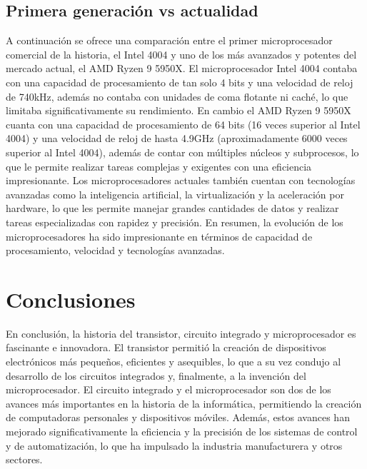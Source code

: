 \documentclass{article}
\begin{document}

\subsection*{Primera generación vs actualidad}
A continuación se ofrece una comparación entre el primer microprocesador comercial de la historia, 
el Intel 4004 y uno de los más avanzados y potentes del mercado actual, el AMD Ryzen 9 5950X. 
El microprocesador Intel 4004 contaba con una capacidad de procesamiento de tan solo 4 bits y una 
velocidad de reloj de 740kHz, además no contaba con unidades de coma flotante ni caché, lo que limitaba 
significativamente su rendimiento. En cambio el AMD Ryzen 9 5950X cuanta con una capacidad de procesamiento
de 64 bits (16 veces superior al Intel 4004) y una velocidad de reloj de hasta 4.9GHz (aproximadamente 6000 veces superior 
al Intel 4004), además de contar con múltiples núcleos y subprocesos, lo que le permite realizar tareas complejas 
y exigentes con una eficiencia impresionante. Los microprocesadores actuales también cuentan con tecnologías avanzadas 
como la inteligencia artificial, la virtualización y la aceleración por hardware, lo que les permite manejar 
grandes cantidades de datos y realizar tareas especializadas con rapidez y precisión. En resumen, la evolución de 
los microprocesadores ha sido impresionante en términos de capacidad de procesamiento, velocidad y tecnologías avanzadas.


\newpage
\section*{Conclusiones}

En conclusión, la historia del transistor, circuito integrado y microprocesador es fascinante e innovadora.  
El transistor permitió la creación de dispositivos electrónicos más pequeños, eficientes y asequibles, 
lo que a su vez condujo al desarrollo de los circuitos integrados y, finalmente, a la invención del microprocesador.
El circuito integrado y el microprocesador son dos de los avances más importantes en la historia de la informática, 
permitiendo la creación de computadoras personales y dispositivos móviles. Además, estos avances han mejorado 
significativamente la eficiencia y la precisión de los sistemas de control y de automatización, lo que ha 
impulsado la industria manufacturera y otros sectores.
\end{document}
